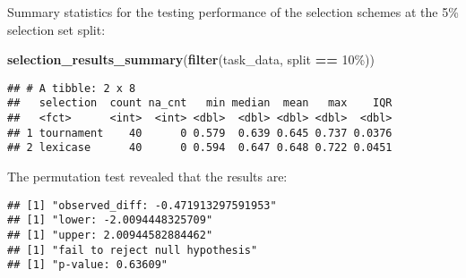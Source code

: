 \documentclass[
]{book}
\newenvironment{Shaded}{\begin{snugshade}}{\end{snugshade}}
\newcommand{\AttributeTok}[1]{\textcolor[rgb]{0.13,0.29,0.53}{#1}}
\newcommand{\DecValTok}[1]{\textcolor[rgb]{0.00,0.00,0.81}{#1}}
\newcommand{\FunctionTok}[1]{\textcolor[rgb]{0.13,0.29,0.53}{\textbf{#1}}}
\newcommand{\NormalTok}[1]{#1}
\newcommand{\OtherTok}[1]{\textcolor[rgb]{0.56,0.35,0.01}{#1}}
\newcommand{\SpecialCharTok}[1]{\textcolor[rgb]{0.81,0.36,0.00}{\textbf{#1}}}
\newcommand{\StringTok}[1]{\textcolor[rgb]{0.31,0.60,0.02}{#1}}
\begin{document}
Summary statistics for the testing performance of the selection schemes at the 5\% selection set split:

\begin{Shaded}
\begin{Highlighting}[]
\FunctionTok{selection\_results\_summary}\NormalTok{(}\FunctionTok{filter}\NormalTok{(task\_data, split }\SpecialCharTok{==} \StringTok{\textquotesingle{}10\%\textquotesingle{}}\NormalTok{))}
\end{Highlighting}
\end{Shaded}

\begin{verbatim}
## # A tibble: 2 x 8
##   selection  count na_cnt   min median  mean   max    IQR
##   <fct>      <int>  <int> <dbl>  <dbl> <dbl> <dbl>  <dbl>
## 1 tournament    40      0 0.579  0.639 0.645 0.737 0.0376
## 2 lexicase      40      0 0.594  0.647 0.648 0.722 0.0451
\end{verbatim}

The permutation test revealed that the results are:

\begin{Shaded}
\end{Shaded}

\begin{verbatim}
## [1] "observed_diff: -0.471913297591953"
## [1] "lower: -2.0094448325709"
## [1] "upper: 2.00944582884462"
## [1] "fail to reject null hypothesis"
## [1] "p-value: 0.63609"
\end{verbatim}
\end{document}
